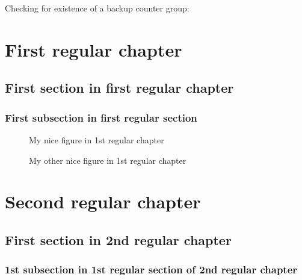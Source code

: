 \documentclass{book}
\begin{document}
Checking for existence of a backup counter group:





\clearpage
\tableofcontents
\listoffigures

\chapter{First regular chapter}

\section{First section in first regular chapter}

\subsection{First subsection in first regular section}



\begin{figure}
\caption{My nice figure in 1st regular chapter}
\end{figure}


\begin{figure}
\caption{My other nice figure in 1st regular chapter}
\end{figure}



\chapter{Second regular chapter}

\section{First section in 2nd regular chapter}

\subsection{1st subsection in 1st regular section of 2nd regular chapter}
\end{document}
